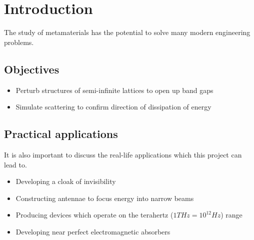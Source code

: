 \chapter{Introduction}
The study of metamaterials has the potential to solve many modern engineering
problems.

\section{Objectives}
\begin{itemize}
\item Perturb structures of semi-infinite lattices to open up band gaps
\item Simulate scattering to confirm direction of dissipation of energy
\end{itemize}

\section{Practical applications}
It is also important to discuss the real-life applications which this project
can lead to.

\begin{itemize}
\item Developing a cloak of invisibility \cite{emcloak}
\item Constructing antennae to focus energy into narrow beams \cite{diremi}
\item Producing devices which operate on the terahertz ($1THz=10^{12}Hz$) range
      \cite{THz}
\item Developing near perfect electromagnetic absorbers \cite{absorbing}
\end{itemize}
